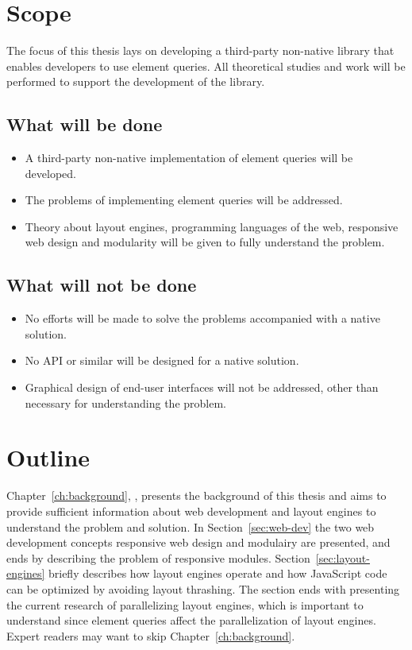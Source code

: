 \documentclass[a4paper,11pt]{kth-mag}
\begin{document}
    \section{Scope}
      The focus of this thesis lays on developing a \gls{third-party} non-\gls{native} library that enables developers to use element queries.
      All theoretical studies and work will be performed to support the development of the library.

      \subsection{What will be done}
      \begin{itemize}
      \item A \gls{third-party} non-\gls{native} implementation of element queries will be developed.
      \item The problems of implementing element queries  will be addressed.
      \item Theory about \glspl{layout engine}, programming languages of the \gls{web}, \gls{responsive} \gls{web} design and modularity will be given to fully understand the problem.
      \end{itemize}

      \subsection{What will not be done}
      \begin{itemize}
      \item No efforts will be made to solve the problems accompanied with a \gls{native} solution.
      \item No \gls{API} or similar will be designed for a \gls{native} solution.
      \item Graphical design of end-user interfaces will not be addressed, other than necessary for understanding the problem.
      \end{itemize}
    \section{Outline}
      \newcommand{\chref}[1]{Chapter~\ref{#1}, \emph{\nameref{#1}},}
      \chref{ch:background} presents the background of this thesis and aims to provide sufficient information about \gls{web} development and \glspl{layout engine} to understand the problem and solution.
      In Section~\ref{sec:web-dev} the two \gls{web} development concepts \gls{responsive} \gls{web} design and modulairy are presented, and ends by describing the problem of \gls{responsive} modules.
      Section~\ref{sec:layout-engines} briefly describes how \glspl{layout engine} operate and how \gls{JavaScript} code can be optimized by avoiding \gls{layout thrashing}.
      The section ends with presenting the current research of parallelizing \glspl{layout engine}, which is important to understand since element queries affect the parallelization of \glspl{layout engine}.
      Expert readers may want to skip Chapter~\ref{ch:background}.
\end{document}
